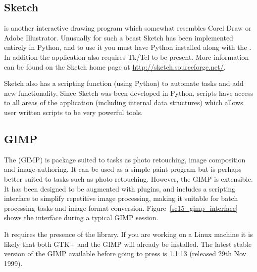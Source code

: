 \documentclass[twoside,11pt]{starlink}
\begin{document}
\subsection{Sketch\label{sc15_sketch}}

 is another
interactive drawing program which somewhat resembles Corel Draw or
Adobe Illustrator. Unusually for such a beast Sketch has been
implemented entirely in Python, and to use it you must have Python
installed along with the . In addition the application also requires
Tk/Tcl to be present. More information can be found on the
Sketch home page at \url{http://sketch.sourceforge.net/}.

Sketch also has a scripting function (using Python) to automate tasks
and add new functionality. Since Sketch was been developed in Python,
scripts have access to all areas of the application (including
internal data structures) which allows user written scripts to be very
powerful tools.

\subsection{GIMP\label{sc15_gimp}}

The  (GIMP) is package suited to tasks as
photo retouching, image composition and image authoring. It can be
used as a simple paint program but is perhaps better suited to tasks
such as photo retouching. However, the GIMP is extensible. It has been
designed to be augmented with plugins, and includes a scripting
interface to simplify repetitive image processing, making it suitable
for batch processing tasks and image format conversion.
Figure~\ref{sc15_gimp_interface} shows the interface during a typical
GIMP session.


It requires the presence of the
 library. If you are
working on a Linux machine it is likely that both GTK+ and the GIMP
will already be installed. The latest stable version of the GIMP
available before going to press is 1.1.13 (released 29th Nov 1999).
\end{document}
